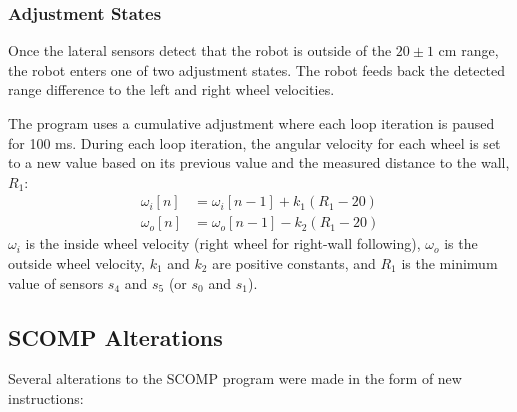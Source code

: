 \subsubsection{Adjustment States}

Once the lateral sensors detect that the robot is outside of the
\(20\pm1\) cm range, the robot enters one of two adjustment
states. The robot feeds back the detected range difference to the left
and right wheel velocities. 

The program uses a cumulative adjustment
where each loop iteration is paused for 100 ms. During each loop
iteration, the angular velocity for each wheel is set to a new value
based on its previous value and the measured distance to the wall, \(R_1\):
\begin{align}
\omega_i [n] &= \omega_i [n -1] + k_1 (R_1 - 20) \label{wi}\\
\omega_o [n] &= \omega_o [n -1] - k_2 (R_1 - 20) \label{wo}
\end{align}
\(\omega_i\) is the inside wheel velocity (right wheel for right-wall
following), \(\omega_o\) is the outside wheel velocity, \(k_1\) and
\(k_2\) are positive constants, and \(R_1\) is the minimum value of sensors \(s_4\)
and \(s_5\) (or \(s_0\) and \(s_1\)).


\subsection{SCOMP Alterations}

Several alterations to the SCOMP program were  made in the form of
new instructions:

